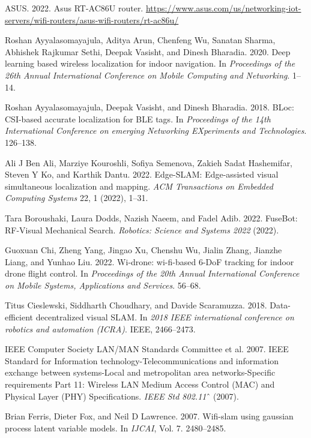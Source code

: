 \documentclass[
	a4paper, %
	11pt, %
	unnumberedsections, %
	twoside, %
]{LTJournalArticle}
\begin{document}
\begin{thebibliography}{99}
ASUS. 2022. Asus RT-AC86U router. \url{https://www.asus.com/us/networking-iot-servers/wifi-routers/asus-wifi-routers/rt-ac86u/}

Roshan Ayyalasomayajula, Aditya Arun, Chenfeng Wu, Sanatan Sharma, Abhishek Rajkumar Sethi, Deepak Vasisht, and Dinesh Bharadia. 2020. Deep learning
based wireless localization for indoor navigation. In \textit{Proceedings of the 26th Annual
International Conference on Mobile Computing and Networking}. 1--14.

Roshan Ayyalasomayajula, Deepak Vasisht, and Dinesh Bharadia. 2018. BLoc: CSI-based accurate localization for BLE tags. In \textit{Proceedings of the 14th International
Conference on emerging Networking EXperiments and Technologies}. 126--138.

Ali J Ben Ali, Marziye Kouroshli, Sofiya Semenova, Zakieh Sadat Hashemifar,
Steven Y Ko, and Karthik Dantu. 2022. Edge-SLAM: Edge-assisted visual simultaneous localization and mapping. \textit{ACM Transactions on Embedded Computing
Systems} 22, 1 (2022), 1--31.

Tara Boroushaki, Laura Dodds, Nazish Naeem, and Fadel Adib. 2022. FuseBot:
RF-Visual Mechanical Search. \textit{Robotics: Science and Systems 2022} (2022).

Guoxuan Chi, Zheng Yang, Jingao Xu, Chenshu Wu, Jialin Zhang, Jianzhe Liang,
and Yunhao Liu. 2022. Wi-drone: wi-fi-based 6-DoF tracking for indoor drone
flight control. In \textit{Proceedings of the 20th Annual International Conference on Mobile
Systems, Applications and Services}. 56--68.

Titus Cieslewski, Siddharth Choudhary, and Davide Scaramuzza. 2018. Data-efficient decentralized visual SLAM. In \textit{2018 IEEE international conference on
robotics and automation (ICRA)}. IEEE, 2466--2473.

IEEE Computer Society LAN/MAN Standards Committee et al. 2007. IEEE Standard for Information technology-Telecommunications and information exchange
between systems-Local and metropolitan area networks-Specific requirements
Part 11: Wireless LAN Medium Access Control (MAC) and Physical Layer (PHY)
Specifications. \textit{IEEE Std 802.11}ˆ (2007).

Brian Ferris, Dieter Fox, and Neil D Lawrence. 2007. Wifi-slam using gaussian
process latent variable models. In \textit{IJCAI}, Vol. 7. 2480--2485.


\end{thebibliography}

\end{document}
